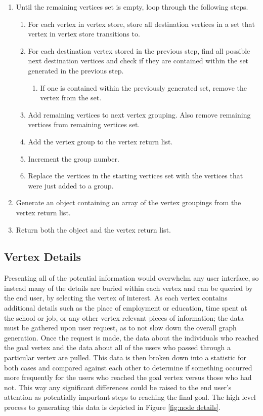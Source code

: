 \begin{enumerate}
   \item Until the remaining vertices set is empty, loop through the following
   steps.
   \begin{enumerate}
     \item For each vertex in vertex store, store all destination vertices in a
     set that vertex in vertex store transitions to.
     \item For each destination vertex stored in the previous step, find all
     possible next destination vertices and check if they are contained within
     the set generated in the previous step.
     \begin{enumerate}
       \item If one is contained within the previously generated set, remove
       the vertex from the set.
     \end{enumerate}
     \item Add remaining vertices to next vertex grouping.  Also remove remaining
     vertices from remaining vertices set.
     \item Add the vertex group to the vertex return list.
     \item Increment the group number.
     \item Replace the vertices in the starting vertices set with the vertices
     that were just added to a group.
   \end{enumerate} 
   \item Generate an object containing an array of the vertex groupings from
   the vertex return list.
   \item Return both the object and the vertex return list.
 \end{enumerate}



\subsection{Vertex Details}
Presenting all of the potential information would overwhelm any user interface,
so instead many of the details are buried within each vertex and can be queried
by the end user, by selecting the vertex of interest.  As each vertex contains
additional details such as the place of employment or education, time spent at
the school or job, or any other vertex relevant pieces of information; the data
must be gathered upon user request, as to not slow down the overall graph
generation.  Once the request is made, the data about the individuals who
reached the goal vertex and the data about all of the users who passed through a
particular vertex are pulled.  This data is then broken down into a statistic for
both cases and compared against each other to determine if something occurred
more frequently for the users who reached the goal vertex versus those who had
not.  This way any significant differences could be raised to the end user's
attention as potentially important steps to reaching the final goal.  The high
level process to generating this data is depicted in Figure \ref{fig:node
details}.

